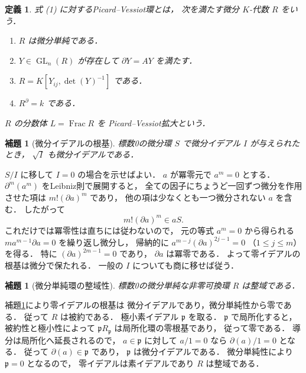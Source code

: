 \documentclass[a5paper,10pt,onecolumn]{jsarticle}
\makeatletter
\theoremstyle{mathnotetheorem}
\newtheorem{definition}[theorem]{定義}
\newtheorem{lemma}[theorem]{補題}
\renewcommand{\proofname}{証明}
\renewenvironment{proof}[1][\proofname]{%
  \par\pushQED{\qed}\normalfont\topsep4\p@\@plus2\p@\relax
  \trivlist\item[\hskip\labelsep\bfseries #1]\ignorespaces
}{\popQED\endtrivlist\@endpefalse}
\makeatother
\begin{document}
\begin{definition}
式 (1) に対するPicard--Vessiot環とは，
次を満たす微分 $K$-代数 $R$ をいう．
\begin{enumerate}
\item $R$ は微分単純である．
\item $Y\in\operatorname{GL}_n(R)$ が存在して
 $\partial Y=AY$ を満たす．
\item $R=K[Y_{ij},\det(Y)^{-1}]$ である．
\item $R^\partial=k$ である．
\end{enumerate}
$R$ の分数体 $L=\operatorname{Frac}R$ を
Picard--Vessiot拡大という．
\end{definition}

\begin{lemma}[微分イデアルの根基]\label{lem:radical}
標数0の微分環 $S$ で微分イデアル $I$ が与えられたとき，
$\sqrt I$ も微分イデアルである．
\end{lemma}
\begin{proof}
$S/I$ に移して $I=0$ の場合を示せばよい．
$a$ が冪零元で $a^m=0$ とする．
$\partial^m(a^m)$ をLeibniz則で展開すると，
全ての因子にちょうど一回ずつ微分を作用させた項は
$m!(\partial a)^m$ であり，
他の項は少なくとも一つ微分されない $a$ を含む．
したがって
\[
 m!(\partial a)^m\in aS.
\]
これだけでは冪零性は直ちには従わないので，
元の等式 $a^m=0$ から得られる
$ma^{m-1}\partial a=0$ を繰り返し微分し，
帰納的に
$a^{m-j}(\partial a)^{2j-1}=0$
（$1\le j\le m$）を得る．
特に $(\partial a)^{2m-1}=0$ であり，
$\partial a$ は冪零である．
よって零イデアルの根基は微分で保たれる．
一般の $I$ についても商に移せば従う．
\end{proof}

\begin{lemma}[微分単純環の整域性]\label{lem:domain}
標数0の微分単純な非零可換環 $R$ は整域である．
\end{lemma}
\begin{proof}
補題\ref{lem:radical}により零イデアルの根基は
微分イデアルであり，微分単純性から零である．
従って $R$ は被約である．
極小素イデアル $\mathfrak p$ を取る．
$\mathfrak p$ で局所化すると，
被約性と極小性によって
$\mathfrak p R_{\mathfrak p}$ は局所化環の零根基であり，
従って零である．
導分は局所化へ延長されるので，
$a\in\mathfrak p$ に対して
$a/1=0$ なら
$\partial(a)/1=0$ となる．
従って $\partial(a)\in\mathfrak p$ であり，
$\mathfrak p$ は微分イデアルである．
微分単純性により $\mathfrak p=0$ となるので，
零イデアルは素イデアルであり $R$ は整域である．
\end{proof}
\end{document}
